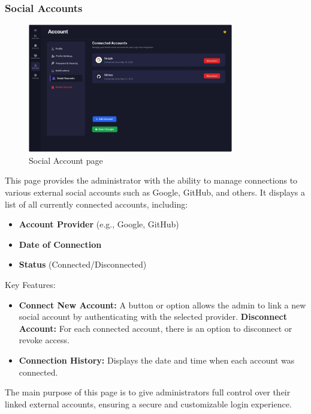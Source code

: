 \documentclass[11pt,a4paper]{article}
\begin{document}
	\subsubsection{Social Accounts}
	\begin{figure}[h]
		\centering
		\includegraphics[width=0.8\textwidth]{pictures/admin/Connected_Accounts_Admin}
		\caption{Social Account page}\label{fig:figure8}
	\end{figure}
	This page provides the administrator with the ability to manage connections to various external social accounts such as Google, GitHub, and others. It displays a list of all currently connected accounts, including:
	\begin{itemize}
		\item \textbf{Account Provider} (e.g., Google, GitHub)
		\item \textbf{Date of Connection}
		\item \textbf{Status} (Connected/Disconnected)
	\end{itemize}
	Key Features:
	\begin{itemize}
		\item \textbf{Connect New Account:} A button or option allows the admin to link a new social account by authenticating with the selected provider.
		\textbf{Disconnect Account:} For each connected account, there is an option to disconnect or revoke access.
		\item \textbf{Connection History:} Displays the date and time when each account was connected.
	\end{itemize}
	The main purpose of this page is to give administrators full control over their linked external accounts, ensuring a secure and customizable login experience.
	
	
\end{document}
